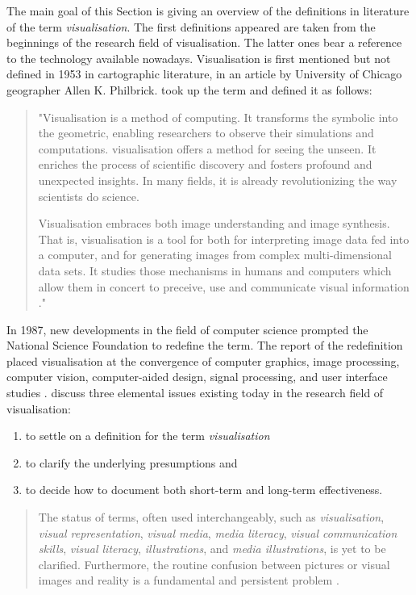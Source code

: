 \cbstart
The main goal of this Section is giving an overview of the definitions in literature of the term \textit{visualisation}. The first definitions appeared are taken from the beginnings of the research field of visualisation. The latter ones bear a reference to the technology available nowadays.
\cbend
Visualisation is first mentioned but not defined in 1953 in cartographic literature, in an article by University of Chicago geographer Allen K. Philbrick. \citeauthor{mccormick:1987} took up the term and defined it as follows:
\begin{quote}
 "Visualisation is a method of computing. It transforms the symbolic into the geometric, enabling researchers to observe their simulations and computations. visualisation offers a method for seeing the unseen. It enriches the process of scientific discovery and fosters profound and unexpected insights. In many fields, it is already revolutionizing the way scientists do science.

 Visualisation embraces both image understanding and image synthesis. That is, visualisation is a tool for both for interpreting image data fed into a computer, and for generating images from complex multi-dimensional data sets. It studies those mechanisms in humans and computers which allow them in concert to preceive, use and communicate visual information ."
\end{quote}

In 1987, new developments in the field of computer science prompted the National Science Foundation to redefine the term. The report of the redefinition placed visualisation at the convergence of computer graphics, image processing, computer vision, computer-aided design, signal processing, and user interface studies . \citeauthor{Phillips2010} discuss three elemental issues existing today in the research field of visualisation:

\begin{enumerate}
\item to settle on a definition for the term \textit{visualisation}
\item to clarify the underlying presumptions and
\item to decide how to document both short-term and long-term effectiveness.
\end{enumerate}

\begin{quote}
The status of terms, often used interchangeably, such as \textit{visualisation}, \textit{visual representation}, \textit{visual media}, \textit{media literacy}, \textit{visual communication skills}, \textit{visual literacy}, \textit{illustrations}, and \textit{media illustrations}, is yet to be clarified. Furthermore, the routine confusion between pictures or visual images and reality is a fundamental and persistent problem .
\end{quote}

